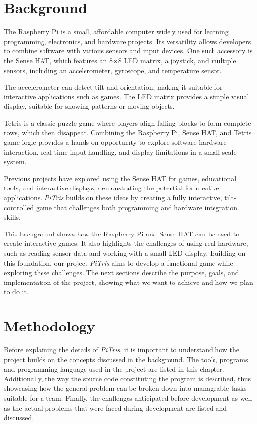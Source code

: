 \documentclass[11pt,titlepage,openright]{book}
\begin{document}
\chapter{Background}
\label{cha:background}

The Raspberry Pi is a small, affordable computer widely used for learning programming, electronics, and hardware projects. Its versatility allows developers to combine software with various sensors and input devices. One such accessory is the Sense HAT, which features an 8$\times$8 LED matrix, a joystick, and multiple sensors, including an accelerometer, gyroscope, and temperature sensor.

The accelerometer can detect tilt and orientation, making it suitable for interactive applications such as games. The LED matrix provides a simple visual display, suitable for showing patterns or moving objects.

Tetris is a classic puzzle game where players align falling blocks to form complete rows, which then disappear. Combining the Raspberry Pi, Sense HAT, and Tetris game logic provides a hands-on opportunity to explore software-hardware interaction, real-time input handling, and display limitations in a small-scale system.

Previous projects have explored using the Sense HAT for games, educational tools, and interactive displays, demonstrating the potential for creative applications. \textit{PiTris} builds on these ideas by creating a fully interactive, tilt-controlled game that challenges both programming and hardware integration skills.

This background shows how the Raspberry Pi and Sense HAT can be used to create interactive games. It also highlights the challenges of using real hardware, such as reading sensor data and working with a small LED display. Building on this foundation, our project \textit{PiTris} aims to develop a functional game while exploring these challenges. The next sections describe the purpose, goals, and implementation of the project, showing what we want to achieve and how we plan to do it.

\chapter{Methodology}
Before explaining the details of \textit{PiTris}, it is important to understand how the project builds on the concepts discussed in the background. The tools, programs and programming language used in the project are listed in this chapter. Additionally, the way the source code constituting the program is described, thus showcasing how the general problem can be broken down into manageable tasks suitable for a team. Finally, the challenges anticipated before development as well as the actual problems that were faced during development are listed and discussed.
\end{document}
